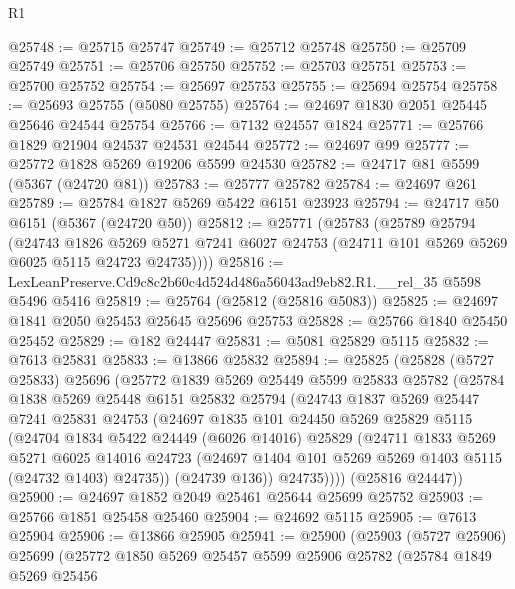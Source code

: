 \begin{lexlean}{R1}
\begin{coremodule}
@25748 := @25715 @25747
@25749 := @25712 @25748
@25750 := @25709 @25749
@25751 := @25706 @25750
@25752 := @25703 @25751
@25753 := @25700 @25752
@25754 := @25697 @25753
@25755 := @25694 @25754
@25758 := @25693 @25755 (@5080 @25755)
@25764 := @24697 @1830 @2051 @25445 @25646 @24544 @25754
@25766 := @7132 @24557 @1824
@25771 := @25766 @1829 @21904 @24537 @24531 @24544
@25772 := @24697 @99
@25777 := @25772 @1828 @5269 @19206 @5599 @24530
@25782 := @24717 @81 @5599 (@5367 (@24720 @81))
@25783 := @25777 @25782
@25784 := @24697 @261
@25789 := @25784 @1827 @5269 @5422 @6151 @23923
@25794 := @24717 @50 @6151 (@5367 (@24720 @50))
@25812 := @25771
    (@25783
      (@25789
        @25794
        (@24743
          @1826
          @5269
          @5271
          @7241
          @6027
          @24753
          (@24711 @101 @5269 @5269 @6025 @5115 @24723 @24735))))
@25816 := LexLeanPreserve.Cd9c8c2b60c4d524d486a56043ad9eb82.R1.__rel_35 @5598 @5496 @5416
@25819 := @25764 (@25812 (@25816 @5083))
@25825 := @24697 @1841 @2050 @25453 @25645 @25696 @25753
@25828 := @25766 @1840 @25450 @25452
@25829 := @182 @24447
@25831 := @5081 @25829 @5115
@25832 := @7613 @25831
@25833 := @13866 @25832
@25894 := @25825
    (@25828
      (@5727 @25833)
      @25696
      (@25772
        @1839
        @5269
        @25449
        @5599
        @25833
        @25782
        (@25784
          @1838
          @5269
          @25448
          @6151
          @25832
          @25794
          (@24743
            @1837
            @5269
            @25447
            @7241
            @25831
            @24753
            (@24697
              @1835
              @101
              @24450
              @5269
              @25829
              @5115
              (@24704
                @1834
                @5422
                @24449
                (@6026 @14016)
                @25829
                (@24711
                  @1833
                  @5269
                  @5271
                  @6025
                  @14016
                  @24723
                  (@24697 @1404 @101 @5269 @5269 @1403 @5115 (@24732 @1403) @24735))
                (@24739 @136))
              @24735))))
      (@25816 @24447))
@25900 := @24697 @1852 @2049 @25461 @25644 @25699 @25752
@25903 := @25766 @1851 @25458 @25460
@25904 := @24692 @5115
@25905 := @7613 @25904
@25906 := @13866 @25905
@25941 := @25900
    (@25903
      (@5727 @25906)
      @25699
      (@25772
        @1850
        @5269
        @25457
        @5599
        @25906
        @25782
        (@25784
          @1849
          @5269
          @25456

\end{coremodule}
\end{lexlean}
